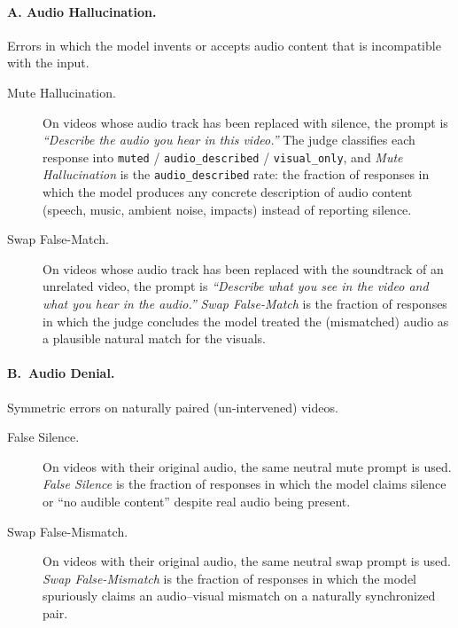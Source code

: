 \documentclass{llmxive}
\begin{document}
\paragraph{A. Audio Hallucination.}
Errors in which the model invents or accepts audio content that is
incompatible with the input.

\begin{description}
  \item[Mute Hallucination.] On videos whose audio track has been replaced
    with silence, the prompt is \textit{``Describe the audio you hear in this
    video.''} The judge classifies each response into
    \texttt{muted} / \texttt{audio\_described} / \texttt{visual\_only}, and
    \emph{Mute Hallucination} is the \texttt{audio\_described} rate: the
    fraction of responses in which the model produces any concrete description
    of audio content (speech, music, ambient noise, impacts) instead of
    reporting silence.

  \item[Swap False-Match.] On videos whose audio track has been replaced with
    the soundtrack of an unrelated video, the prompt is \textit{``Describe
    what you see in the video and what you hear in the audio.''}
    \emph{Swap False-Match} is the fraction of responses in which the judge
    concludes the model treated the (mismatched) audio as a plausible natural
    match for the visuals.
\end{description}

\paragraph{B.\ Audio Denial.}
Symmetric errors on naturally paired (un-intervened) videos.

\begin{description}
  \item[False Silence.] On videos with their original audio, the same neutral
    mute prompt is used. \emph{False Silence} is the fraction of responses in
    which the model claims silence or ``no audible content'' despite real
    audio being present.

  \item[Swap False-Mismatch.] On videos with their original audio, the same
    neutral swap prompt is used. \emph{Swap False-Mismatch} is the fraction
    of responses in which the model spuriously claims an audio--visual
    mismatch on a naturally synchronized pair.
\end{description}
\end{document}
